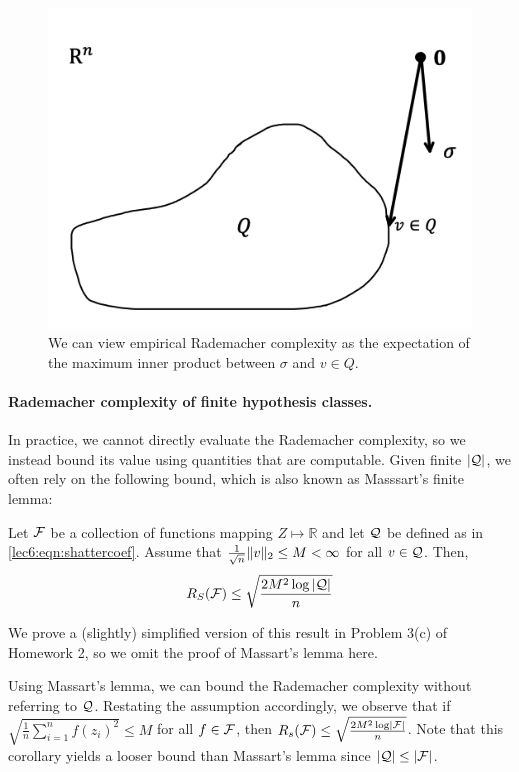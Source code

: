 \begin{figure}[ht!]
	\begin{center}
		\includegraphics[width=.5\textwidth]{figures/remark2.png}
	\end{center}
	\caption{We can view empirical Rademacher complexity as the expectation of the maximum inner product between $\sigma$ and $v\in Q$.}
	\label{lec6:fig:rs-innerprod}
\end{figure}

\paragraph{Rademacher complexity of finite hypothesis classes.} In practice, we cannot directly evaluate the Rademacher complexity, so we instead bound its value using quantities that are computable. Given finite $|\mathcal Q|$, we often rely on the following bound, which is also known as Masssart's finite lemma: 
\begin{proposition}
    Let $\mathcal F$ be a collection of functions mapping $Z \mapsto \mathbb{R}$ and let $\mathcal Q$ be defined as in \eqref{lec6:eqn:shattercoef}. Assume that $\frac{1}{\sqrt{n}} \|v\|_2 \le M < \infty$ for all $v \in \mathcal Q$. Then,
    \begin{align}
        R_S(\mathcal F) \leq \sqrt{\frac{2 M^2 \log |\mathcal Q|}{n}}
    \end{align}
    \label{lec6:prop:massartlemma}
\end{proposition}
We prove a (slightly) simplified version of this result in Problem 3(c) of Homework 2, so we omit the proof of Massart's lemma here. 

\begin{remark}
    Using Massart's lemma, we can bound the Rademacher complexity without referring to $\mathcal Q$. Restating the assumption accordingly, we observe that if $\sqrt{\frac{1}{n}\sum_{i=1}^n f(z_i)^2} \le M$ for all $f \in \mathcal F$, then $R_s(\mathcal F) \le \sqrt{\frac{2M^2\log \left\lvert\mathcal F\right\rvert}{n}}$. Note that this corollary yields a looser bound than Massart's lemma since $|\mathcal Q| \leq |\mathcal F|$. 
\end{remark}
    

